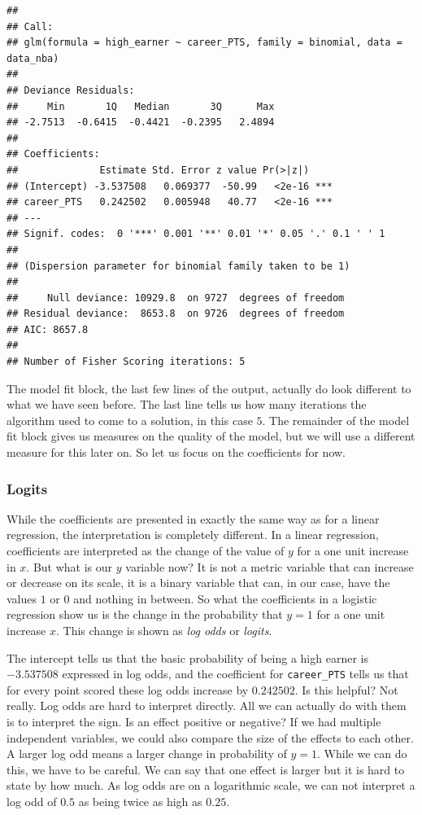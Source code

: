 \documentclass[
]{book}
\begin{document}
\begin{verbatim}
## 
## Call:
## glm(formula = high_earner ~ career_PTS, family = binomial, data = data_nba)
## 
## Deviance Residuals: 
##     Min       1Q   Median       3Q      Max  
## -2.7513  -0.6415  -0.4421  -0.2395   2.4894  
## 
## Coefficients:
##              Estimate Std. Error z value Pr(>|z|)    
## (Intercept) -3.537508   0.069377  -50.99   <2e-16 ***
## career_PTS   0.242502   0.005948   40.77   <2e-16 ***
## ---
## Signif. codes:  0 '***' 0.001 '**' 0.01 '*' 0.05 '.' 0.1 ' ' 1
## 
## (Dispersion parameter for binomial family taken to be 1)
## 
##     Null deviance: 10929.8  on 9727  degrees of freedom
## Residual deviance:  8653.8  on 9726  degrees of freedom
## AIC: 8657.8
## 
## Number of Fisher Scoring iterations: 5
\end{verbatim}

The model fit block, the last few lines of the output, actually do look
different to what we have seen before. The last line tells us how many
iterations the algorithm used to come to a solution, in this case \(5\).
The remainder of the model fit block gives us measures on the quality of
the model, but we will use a different measure for this later on. So let
us focus on the coefficients for now.

\hypertarget{logits}{%
\subsubsection{Logits}\label{logits}}

While the coefficients are presented in exactly the same way as for a linear
regression, the interpretation is completely different. In a linear
regression, coefficients are interpreted as the change of the value of
\(y\) for a one unit increase in \(x\). But what is our \(y\) variable now? It
is not a metric variable that can increase or decrease on its scale, it
is a binary variable that can, in our case, have the values \(1\) or \(0\)
and nothing in between. So what the coefficients in a logistic
regression show us is the change in the probability that \(y = 1\) for a
one unit increase \(x\). This change is shown as \emph{log odds} or \emph{logits}.

The intercept tells us that the basic probability of being a high earner
is \(-3.537508\) expressed in log odds, and the coefficient for \texttt{career\_PTS}
tells us that for every point scored these log odds increase by
\(0.242502\). Is this helpful? Not really. Log odds are hard to interpret
directly. All we can actually do with them is to interpret the sign. Is
an effect positive or negative? If we had multiple independent
variables, we could also compare the size of the effects to each other.
A larger log odd means a larger change in probability of \(y = 1\). While
we can do this, we have to be careful. We can say that one effect is
larger but it is hard to state by how much. As log odds are on a
logarithmic scale, we can not interpret a log odd of \(0.5\) as being
twice as high as \(0.25\).
\end{document}

